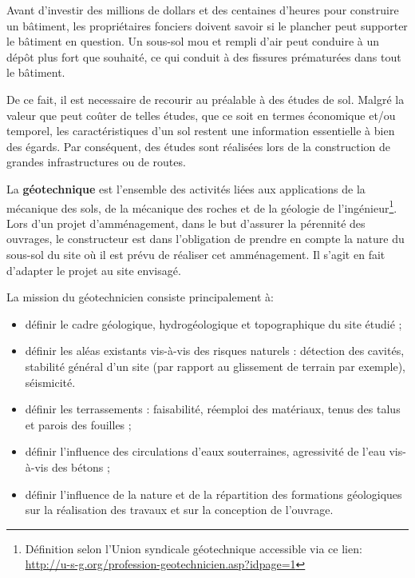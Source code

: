 \par
Avant d’investir des millions de dollars et des centaines d’heures pour 
construire un bâtiment, les propriétaires fonciers doivent savoir si le 
plancher peut supporter le bâtiment en question. Un sous-sol mou et 
rempli d'air peut conduire à un dépôt plus fort que souhaité, ce qui 
conduit à des fissures prématurées dans tout le bâtiment.
\par
De ce fait, il est necessaire de recourir au préalable à des études de sol.   
Malgré la valeur que peut coûter de telles études, que ce soit en termes
économique et/ou temporel, les caractéristiques d’un sol restent une
information essentielle à bien des égards. Par conséquent, des études sont 
réalisées lors de la construction de grandes infrastructures ou de routes. 
\par 
La \textbf{géotechnique} est l’ensemble des 
activités liées aux applications de la mécanique des sols, de la mécanique 
des roches et de la géologie de l’ingénieur\footnote{
    Définition selon l’Union syndicale géotechnique accessible via ce lien: 
    \url{http://u-s-g.org/profession-geotechnicien.asp?idpage=1}}.
Lors d'un projet d'amménagement, dans le but d'assurer  la pérennité
des ouvrages, le constructeur est dans l'obligation de prendre en compte
la nature du sous-sol du site où il est prévu de réaliser cet amménagement.
Il s'agit en fait d'adapter le projet au site envisagé.
\par
La mission du géotechnicien consiste principalement à:
\begin{itemize}
    \item définir le cadre géologique, hydrogéologique et topographique 
    du site étudié ;
    \item définir les aléas existants vis-à-vis des risques naturels : 
    détection des cavités, stabilité général d’un site (par rapport au 
    glissement de terrain par exemple), séismicité.
    \item définir les terrassements : faisabilité, réemploi des matériaux, 
    tenus des talus et parois des fouilles ;
    \item définir l’influence des circulations d’eaux souterraines, 
    agressivité de l’eau vis-à-vis des bétons ;
    \item définir l’influence de la nature et de la répartition des 
    formations géologiques sur la réalisation des travaux et sur la conception 
    de l’ouvrage.
\end{itemize}
